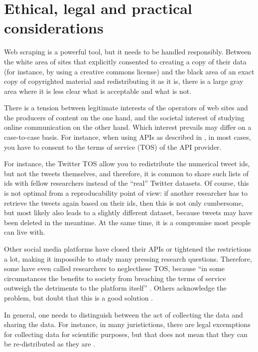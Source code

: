 \section{Ethical, legal and practical considerations}
\label{sec:ethicallegalpractical}
Web scraping is a powerful tool, but it needs to be handled
responsibly. Between the white area of sites that explicitly consented
to creating a copy of their data (for instance, by using a creative
commons license) and the black area of an exact copy of copyrighted
material and redistributing it as it is, there is a large gray area
where it is less clear what is acceptable and what is not.

There is a tension between legitimate interests of the operators of
web sites and the producers of content on the one hand, and the
societal interest of studying online communication on the other
hand. Which interest prevails may differ on a case-to-case basis. For
instance, when using APIs as described in , in most
cases, you have to consent to the terms of service (TOS) of the API
provider.

For instance, the Twitter TOS allow you to redistribute the numerical
tweet ids, but not the tweets themselves, and therefore, it is common
to share such lists of ids with fellow researchers instead of the
``real'' Twitter datasets. Of course, this is not optimal from a
reproducability point of view: if another researcher has to retrieve
the tweets again based on their ids, then this is not only cumbersome,
but most likely also leads to a slightly different dataset, because
tweets may have been deleted in the meantime. At the same time, it is
a compromise most people can live with.

Other social media platforms have closed their APIs or tightened the
restrictions a lot, making it impossible to study many pressing
research questions. Therefore, some have even called researchers to
neglecthese TOS, because ``in some circumstances the benefits to
society from breaching the terms of service outweigh the detriments to
the platform itself'' \citep[p.~1561]{Bruns2019}. Others acknowledge
the problem, but doubt that this is a good solution
\citep{Puschmann2019}.

In general, one needs to distinguish between the act of collecting the
data and sharing the data. For instance, in many juristictions, there
are legal excemptions for collecting data for scientific purposes, but
that does not mean that they can be re-distributed as they are
\citep{VanAtteveldt2019}.

